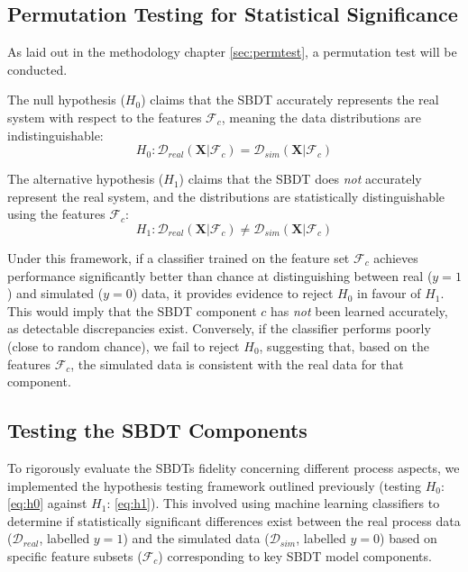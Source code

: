 \subsection*{Permutation Testing for Statistical Significance}
\label{sec:model-logic}

As laid out in the methodology chapter \autoref{sec:permtest}, a permutation test will be conducted.

\noindent The null hypothesis ($H_0$) claims that the SBDT accurately represents the real system with respect to the features $\mathcal{F}_c$, meaning the data distributions are indistinguishable:
\begin{equation}
  H_0: \mathcal{D}_{real}(\mathbf{X} | \mathcal{F}_c) = \mathcal{D}_{sim}(\mathbf{X} | \mathcal{F}_c)
  \label{eq:h0}
\end{equation}

\noindent The alternative hypothesis ($H_1$) claims that the SBDT does \textit{not} accurately represent the real system, and the distributions are statistically distinguishable using the features $\mathcal{F}_c$:
\begin{equation}
  H_1: \mathcal{D}_{real}(\mathbf{X} | \mathcal{F}_c) \neq \mathcal{D}_{sim}(\mathbf{X} | \mathcal{F}_c)
  \label{eq:h1}
\end{equation}

\noindent Under this framework, if a classifier trained on the feature set $\mathcal{F}_c$ achieves performance significantly better than chance at distinguishing between real ($y=1$) and simulated ($y=0$) data, it provides evidence to reject $H_0$ in favour of $H_1$. This would imply that the SBDT component $c$ has \emph{not} been learned accurately, as detectable discrepancies exist. Conversely, if the classifier performs poorly (close to random chance), we fail to reject $H_0$, suggesting that, based on the features $\mathcal{F}_c$, the simulated data is consistent with the real data for that component.

\subsection*{Testing the SBDT Components}
To rigorously evaluate the SBDTs fidelity concerning different process aspects, we implemented the hypothesis testing framework outlined previously (testing $H_0$: \autoref{eq:h0} against $H_1$: \autoref{eq:h1}). This involved using machine learning classifiers to determine if statistically significant differences exist between the real process data ($\mathcal{D}_{real}$, labelled $y=1$) and the simulated data ($\mathcal{D}_{sim}$, labelled $y=0$) based on specific feature subsets ($\mathcal{F}_c$) corresponding to key SBDT model components.


